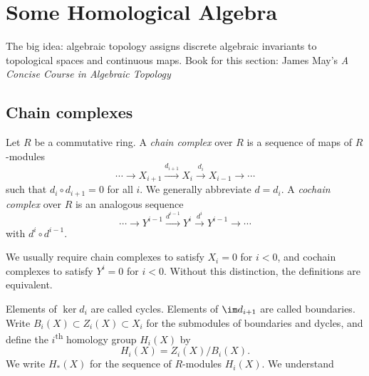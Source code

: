 \chapter{Some Homological Algebra}
The big idea: algebraic topology assigns discrete algebraic invariants to
topological spaces and continuous maps. Book for this section: James May's
\emph{A Concise Course in Algebraic Topology}

\section{Chain complexes}
\begin{definition}
  Let $R$ be a commutative ring. A \emph{chain complex} over $R$ is a sequence
  of maps of $R$-modules
  \[
    \cdots \rightarrow X_{i+1} \xrightarrow{d_{i+1}} X_i \xrightarrow{d_i}
    X_{i-1} \rightarrow \cdots
  \]
  such that $d_i \circ d_{i+1} = 0$ for all $i$. We generally abbreviate $d =
  d_i$. A \emph{cochain complex} over $R$ is an analogous sequence
  \[
    \cdots \rightarrow Y^{i-1} \xrightarrow{d^{i-1}} Y^i \xrightarrow{d^i}
    Y^{i-1} \rightarrow \cdots
  \]
  with $d^i \circ d^{i-1}$.

  We usually require chain complexes to satisfy $X_i = 0$ for $i < 0$, and
  cochain complexes to satisfy $Y^i = 0$ for $i < 0$. Without this distinction,
  the definitions are equivalent.
\end{definition}
\begin{definition}
  Elements of $\ker d_i$ are called cycles. Elements of $\im d_{i+1}$ are called
  boundaries. Write $B_i(X) \subset Z_i(X) \subset X_i$ for the submodules of
  boundaries and dycles, and define the $i$\textsuperscript{th} homology group
  $H_i(X)$ by
  \[
    H_i(X) = Z_i(X) / B_i(X).
  \]
  We write $H_*(X)$ for the sequence of $R$-modules $H_i(X)$. We understand
\end{definition}

